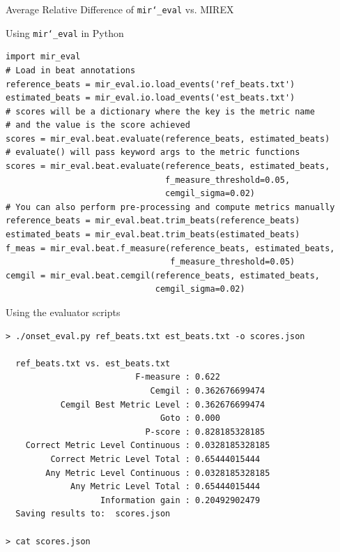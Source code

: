 \documentclass[paperwidth=120cm,paperheight=150cm,portrait,fontscale=.22,margin=5cm,lmargin=.2cm,rmargin=.2cm]{baposter}
\def\mireval{\texttt{mir\char`_eval}}
\begin{document}
\begin{poster}
\begin{posterbox}[name=average,column=0,below=design,span=2]{Average Relative Difference of \mireval{} vs. MIREX}
\end{posterbox}

\begin{posterbox}[name=python,column=0,below=average]{Using \mireval{} in Python}

\begin{verbatim}
import mir_eval
# Load in beat annotations
reference_beats = mir_eval.io.load_events('ref_beats.txt')
estimated_beats = mir_eval.io.load_events('est_beats.txt')
# scores will be a dictionary where the key is the metric name
# and the value is the score achieved
scores = mir_eval.beat.evaluate(reference_beats, estimated_beats)
# evaluate() will pass keyword args to the metric functions
scores = mir_eval.beat.evaluate(reference_beats, estimated_beats,
                                f_measure_threshold=0.05,
                                cemgil_sigma=0.02)
# You can also perform pre-processing and compute metrics manually
reference_beats = mir_eval.beat.trim_beats(reference_beats)
estimated_beats = mir_eval.beat.trim_beats(estimated_beats)
f_meas = mir_eval.beat.f_measure(reference_beats, estimated_beats,
                                 f_measure_threshold=0.05)
cemgil = mir_eval.beat.cemgil(reference_beats, estimated_beats,
                              cemgil_sigma=0.02)
\end{verbatim}

\end{posterbox}

\begin{posterbox}[name=evaluator,column=1,below=average]{Using the evaluator scripts}

\begin{verbatim}
> ./onset_eval.py ref_beats.txt est_beats.txt -o scores.json

  ref_beats.txt vs. est_beats.txt
                          F-measure : 0.622
                             Cemgil : 0.362676699474
           Cemgil Best Metric Level : 0.362676699474
                               Goto : 0.000
                            P-score : 0.828185328185
    Correct Metric Level Continuous : 0.0328185328185
         Correct Metric Level Total : 0.65444015444
        Any Metric Level Continuous : 0.0328185328185
             Any Metric Level Total : 0.65444015444
                   Information gain : 0.20492902479
  Saving results to:  scores.json

> cat scores.json


\end{verbatim}
\end{posterbox}
\end{poster}
\end{document}
